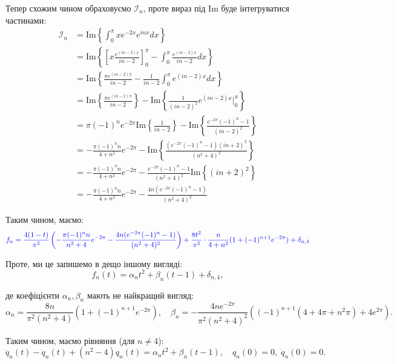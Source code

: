 \documentclass{hw_template}
\begin{document}
Тепер схожим чином обраховуємо $\mathcal{I}_n$, проте вираз під $\text{Im}$ буде інтегруватися частинами:
\begin{align*}
    \mathcal{I}_n &= \text{Im}\left\{ \int_0^{\pi} xe^{-2x}e^{inx}dx \right\} \\
    &= \text{Im}\left\{ \left[ x \frac{e^{(in-2)x}}{in-2}\right]_0^{\pi} - \int_0^{\pi} \frac{e^{(in-2)x}}{in-2}dx \right\} \\
    &= \text{Im}\left\{ \frac{\pi e^{(in-2)\pi}}{in-2} - \frac{1}{in-2}\int_0^{\pi} e^{(in-2)x}dx \right\} \\
    &= \text{Im}\left\{ \frac{\pi e^{(in-2)\pi}}{in-2} \right\} - \text{Im}\left\{\frac{1}{(in-2)^2}e^{(in-2)x}\Big|_0^{\pi} \right\} \\
    &= \pi(-1)^ne^{-2\pi}\text{Im}\left\{ \frac{1}{in-2} \right\} - \text{Im}\left\{\frac{e^{-2\pi}(-1)^n - 1}{(in-2)^2} \right\} \\
    &= -\frac{\pi (-1)^nn}{4+n^2}e^{-2\pi} - \text{Im}\left\{\frac{(e^{-2\pi}(-1)^n - 1)(in+2)^2}{(n^2+4)^2} \right\} \\
    &= -\frac{\pi (-1)^nn}{4+n^2}e^{-2\pi} - \frac{e^{-2\pi}(-1)^n - 1}{(n^2+4)^2}\text{Im}\left\{ (in+2)^2 \right\} \\
    &= -\frac{\pi (-1)^nn}{4+n^2}e^{-2\pi} - \frac{4n(e^{-2\pi}(-1)^n - 1)}{(n^2+4)^2}
\end{align*}

Таким чином, маємо:
\begin{equation*}
    \textcolor{blue}{f_n = \frac{4(1-t)}{\pi^2}\left(-\frac{\pi (-1)^nn}{n^2+4}e^{-2\pi} - \frac{4n(e^{-2\pi}(-1)^n - 1)}{(n^2+4)^2}\right) + \frac{8t^2}{\pi^2}\cdot \frac{n}{4+n^2}(1 + (-1)^{n+1}e^{-2\pi}) + \delta_{n,4}}
\end{equation*}

Проте, ми це запишемо в дещо іншому вигляді:
\begin{equation*}
    f_n(t) = \alpha_nt^2 + \beta_n(t-1) + \delta_{n,4},
\end{equation*}

де коефіцієнти $\alpha_n,\beta_n$ мають не найкращий вигляд:
\begin{equation*}
    \alpha_n = \frac{8n}{\pi^2(n^2+4)}(1 + (-1)^{n+1}e^{-2\pi}), \quad \beta_n = -\frac{4ne^{-2\pi}}{\pi^2(n^2+4)^2}((-1)^{n+1}(4+4\pi+n^2\pi) + 4e^{2\pi}).
\end{equation*}

Таким чином, маємо рівняння (для $n \neq 4$):
\begin{equation*}
    \ddot{q}_n(t) - \dot{q}_n(t) + (n^2- 4)q_n(t) = \alpha_nt^2 + \beta_n(t-1), \quad q_n(0) = 0, \; \dot{q}_n(0) = 0.
\end{equation*}
\end{document}

